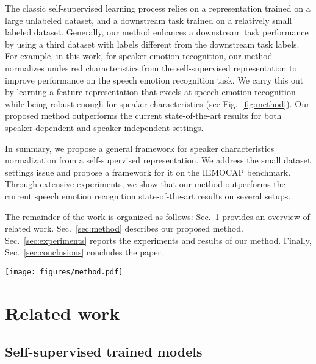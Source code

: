 \documentclass{article}
\renewcommand{\[}{\begin{eqnarray}}
\renewcommand{\]}{\end{eqnarray}}
\begin{document}
The classic self-supervised learning process relies on a representation trained on a large unlabeled dataset, and a downstream task trained on a relatively small labeled dataset. Generally, our method enhances a downstream task performance by using a third dataset with labels different from the downstream task labels. For example, in this work, for speaker emotion recognition, our method normalizes undesired characteristics from the self-supervised representation to improve performance on the speech emotion recognition task. We carry this out by learning a feature representation that excels at speech emotion recognition while being robust enough for speaker characteristics (see Fig.~\ref{fig:method}). Our proposed method outperforms the current state-of-the-art results for both speaker-dependent and speaker-independent settings.

In summary, we propose a general framework for speaker characteristics normalization from a self-supervised representation. We address the small dataset settings issue and propose a framework for it on the IEMOCAP benchmark. Through extensive experiments, we show that our method outperforms the current speech emotion recognition state-of-the-art results on several setups.

The remainder of the work is organized as follows: Sec.~\ref{sec:related_work} provides an overview of related work. Sec.~\ref{sec:method} describes our proposed method. Sec.~\ref{sec:experiments} reports the experiments and results of our method. Finally, Sec.~\ref{sec:conclusions} concludes the paper.


\begin{figure*}[t!]
\centering
\texttt{[image: figures/method.pdf]}
\caption{The architecture of our method: In the forward pass, we learn both speaker identification (SID) and emotion tasks. Speaker features enable a good fit to the training dataset. However, they hinder generalization for unknown speakers. To improve generalization for an unknown speaker, we propose disentangling speaker features from the upstream representation by negating the gradients from the downstream model back to the input in the backward pass.}
\label{fig:method}
\end{figure*}

\section{Related work}\label{sec:related_work}

\subsection{Self-supervised trained models}
\end{document}
